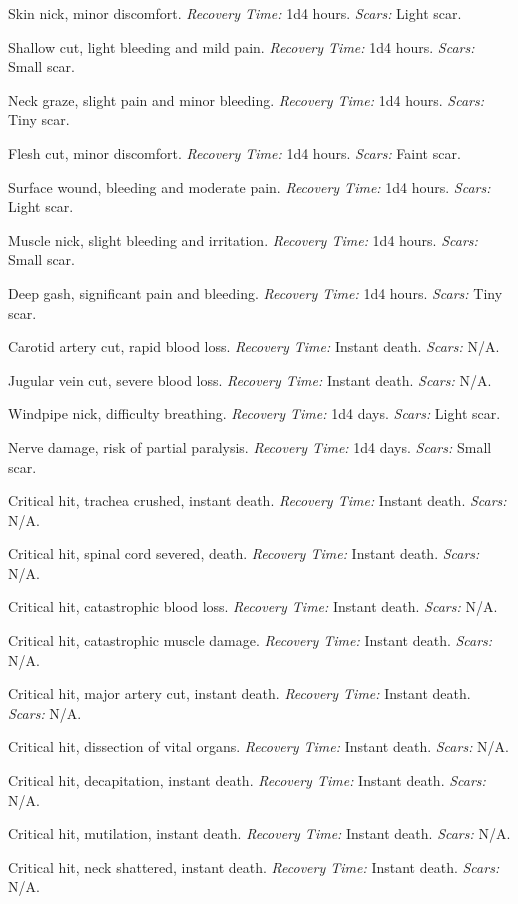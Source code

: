 \documentclass[12pt]{book}  %
\begin{document}
\begin{description}[labelwidth=1.5em, leftmargin=*, itemsep=0.4em]
    \item[1 -] Skin nick, minor discomfort. \textit{Recovery Time:} 1d4 hours. \textit{Scars:} Light scar.
    \item[2 -] Shallow cut, light bleeding and mild pain. \textit{Recovery Time:} 1d4 hours. \textit{Scars:} Small scar.
    \item[3 -] Neck graze, slight pain and minor bleeding. \textit{Recovery Time:} 1d4 hours. \textit{Scars:} Tiny scar.
    \item[4 -] Flesh cut, minor discomfort. \textit{Recovery Time:} 1d4 hours. \textit{Scars:} Faint scar.
    \item[5 -] Surface wound, bleeding and moderate pain. \textit{Recovery Time:} 1d4 hours. \textit{Scars:} Light scar.
    \item[6 -] Muscle nick, slight bleeding and irritation. \textit{Recovery Time:} 1d4 hours. \textit{Scars:} Small scar.
    \item[7 -] Deep gash, significant pain and bleeding. \textit{Recovery Time:} 1d4 hours. \textit{Scars:} Tiny scar.
    \item[8 -] Carotid artery cut, rapid blood loss. \textit{Recovery Time:} Instant death. \textit{Scars:} N/A.
    \item[9 -] Jugular vein cut, severe blood loss. \textit{Recovery Time:} Instant death. \textit{Scars:} N/A.
    \item[10 -] Windpipe nick, difficulty breathing. \textit{Recovery Time:} 1d4 days. \textit{Scars:} Light scar.
    \item[11 -] Nerve damage, risk of partial paralysis. \textit{Recovery Time:} 1d4 days. \textit{Scars:} Small scar.
    \item[12 -] Critical hit, trachea crushed, instant death. \textit{Recovery Time:} Instant death. \textit{Scars:} N/A.
    \item[13 -] Critical hit, spinal cord severed, death. \textit{Recovery Time:} Instant death. \textit{Scars:} N/A.
    \item[14 -] Critical hit, catastrophic blood loss. \textit{Recovery Time:} Instant death. \textit{Scars:} N/A.
    \item[15 -] Critical hit, catastrophic muscle damage. \textit{Recovery Time:} Instant death. \textit{Scars:} N/A.
    \item[16 -] Critical hit, major artery cut, instant death. \textit{Recovery Time:} Instant death. \textit{Scars:} N/A.
    \item[17 -] Critical hit, dissection of vital organs. \textit{Recovery Time:} Instant death. \textit{Scars:} N/A.
    \item[18 -] Critical hit, decapitation, instant death. \textit{Recovery Time:} Instant death. \textit{Scars:} N/A.
    \item[19 -] Critical hit, mutilation, instant death. \textit{Recovery Time:} Instant death. \textit{Scars:} N/A.
    \item[20 -] Critical hit, neck shattered, instant death. \textit{Recovery Time:} Instant death. \textit{Scars:} N/A.
\end{description}
\end{document}
